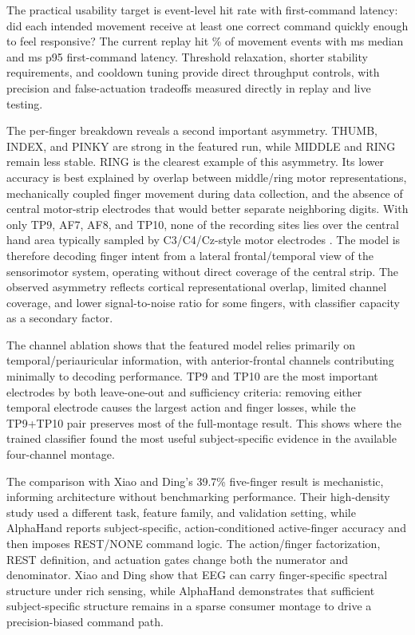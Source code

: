 \documentclass[conference]{IEEEtran}
\begin{document}
The practical usability target is event-level hit rate with first-command latency: did each intended movement receive at least one correct command quickly enough to feel responsive? The current replay hit \FeaturedReplayEventHitRate\% of movement events with \FeaturedReplayLatencyMedianMs{} ms median and \FeaturedReplayLatencyPNinetyFiveMs{} ms p95 first-command latency. Threshold relaxation, shorter stability requirements, and cooldown tuning provide direct throughput controls, with precision and false-actuation tradeoffs measured directly in replay and live testing.

The per-finger breakdown reveals a second important asymmetry. THUMB, INDEX, and PINKY are strong in the featured run, while MIDDLE and RING remain less stable. RING is the clearest example of this asymmetry. Its lower accuracy is best explained by overlap between middle/ring motor representations, mechanically coupled finger movement during data collection, and the absence of central motor-strip electrodes that would better separate neighboring digits. With only TP9, AF7, AF8, and TP10, none of the recording sites lies over the central hand area typically sampled by C3/C4/Cz-style motor electrodes \cite{Bird2019MusePlacement}. The model is therefore decoding finger intent from a lateral frontal/temporal view of the sensorimotor system, operating without direct coverage of the central strip. The observed asymmetry reflects cortical representational overlap, limited channel coverage, and lower signal-to-noise ratio for some fingers, with classifier capacity as a secondary factor.

The channel ablation shows that the featured model relies primarily on temporal/periauricular information, with anterior-frontal channels contributing minimally to decoding performance. TP9 and TP10 are the most important electrodes by both leave-one-out and sufficiency criteria: removing either temporal electrode causes the largest action and finger losses, while the TP9+TP10 pair preserves most of the full-montage result. This shows where the trained classifier found the most useful subject-specific evidence in the available four-channel montage.

The comparison with Xiao and Ding's 39.7\% five-finger result is mechanistic, informing architecture without benchmarking performance. Their high-density study used a different task, feature family, and validation setting, while AlphaHand reports subject-specific, action-conditioned active-finger accuracy and then imposes REST/NONE command logic. The action/finger factorization, REST definition, and actuation gates change both the numerator and denominator. Xiao and Ding show that EEG can carry finger-specific spectral structure under rich sensing, while AlphaHand demonstrates that sufficient subject-specific structure remains in a sparse consumer montage to drive a precision-biased command path.
\end{document}
